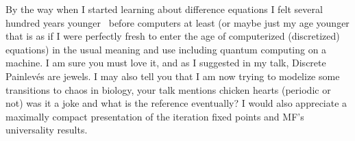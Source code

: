 \begin{description}
By the way when I started learning about difference equations I felt
several hundred years younger \ie\ before computers at least (or maybe just
my age younger that is as if I were perfectly fresh to enter the age of
computerized (discretized)  equations) in the usual meaning and use
including quantum computing on a machine. I am sure you must love it, and
as I suggested in my talk, Discrete Painlev{\'e}s are jewels.
I may also tell you that I am now trying to modelize some transitions to
chaos in biology, your talk mentions chicken hearts (periodic or not) was
it a joke and what is the reference eventually? I would also appreciate a
maximally compact presentation of the iteration fixed points and MF's
universality results.



\end{description}



\printbibliography[heading=subbibintoc,title={References}]
